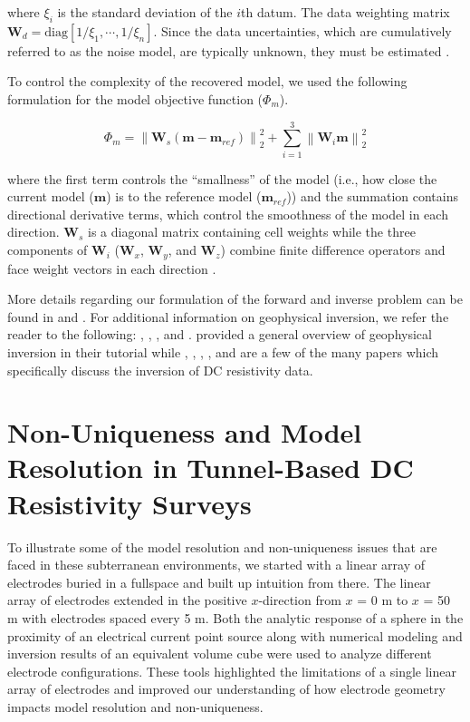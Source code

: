 \documentclass[preprint,authoryear,12pt]{elsarticle}
\begin{document}
\noindent where $\xi_{i}$ is the standard deviation of the $i$th datum. The data weighting matrix $\mathbf{W}_{d} = \text{diag}\left[1/\xi_{1}, \cdots, 1/\xi_{n}\right]$. Since the data uncertainties, which are cumulatively referred to as the noise model, are typically unknown, they must be estimated \citep{Oldenburg2005}.

To control the complexity of the recovered model, we used the following formulation for the model objective function ($\Phi_{m}$).

\begin{equation}
\label{eq:Phi_m}
  \Phi_m = \left\|\mathbf{W}_s(\mathbf{m} - \mathbf{m}_{ref})\right\|_2^2 + \sum^{3}_{i=1}\left\|\mathbf{W}_i\mathbf{m}\right\|_2^2
\end{equation}

\noindent where the first term controls the ``smallness'' of the model (i.e., how close the current model ($\mathbf{m}$) is to the reference model ($\mathbf{m}_{ref}$)) and the summation contains directional derivative terms, which control the smoothness of the model in each direction. $\mathbf{W}_s$ is a diagonal matrix containing cell weights while the three components of $\mathbf{W}_i$ ($\mathbf{W}_x$, $\mathbf{W}_y$, and $\mathbf{W}_z$) combine finite difference operators and face weight vectors in each direction \citep{Oldenburg2005}.

More details regarding our formulation of the forward and inverse problem can be found in \citet{Mitchell2016a} and \citet{Mitchell2020}. For additional information on geophysical inversion, we refer the reader to the following: \citet{Menke1984}, \citet{Parker1994}, \citet{Aster2012}, and \citet{Haber2014}. \citet{Oldenburg2005} provided a general overview of geophysical inversion in their tutorial while \citet{Li1994}, \citet{LaBrecque1996}, \citet{Loke1996}, \citet{Ramirez1996}, and \citet{Loke2013} are a few of the many papers which specifically discuss the inversion of DC resistivity data.


\section{Non-Uniqueness and Model Resolution in Tunnel-Based DC Resistivity Surveys}
\label{sec:Resolution_&_NonUniqueness}

To illustrate some of the model resolution and non-uniqueness issues that are faced in these subterranean environments, we started with a linear array of electrodes buried in a fullspace and built up intuition from there. The linear array of electrodes extended in the positive $x$-direction from $x$ = 0 m to $x$ = 50 m with electrodes spaced every 5 m. Both the analytic response of a sphere in the proximity of an electrical current point source along with numerical modeling and inversion results of an equivalent volume cube were used to analyze different electrode configurations. These tools highlighted the limitations of a single linear array of electrodes and improved our understanding of how electrode geometry impacts model resolution and non-uniqueness.
\end{document}
